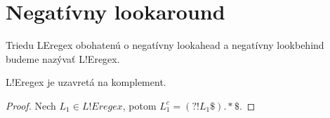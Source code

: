 \section{Negatívny lookaround}\label{chap:negla}

Triedu LEregex obohatenú o negatívny lookahead a negatívny lookbehind budeme nazývať L!Eregex.

\begin{veta}
L!Eregex je uzavretá na komplement.
\end{veta}
\begin{proof}
Nech $L_1 \in L!Eregex$, potom $L_1^c  = \left( ?! L_1 \mathdollar \right) .* \mathdollar $.
\end{proof}
